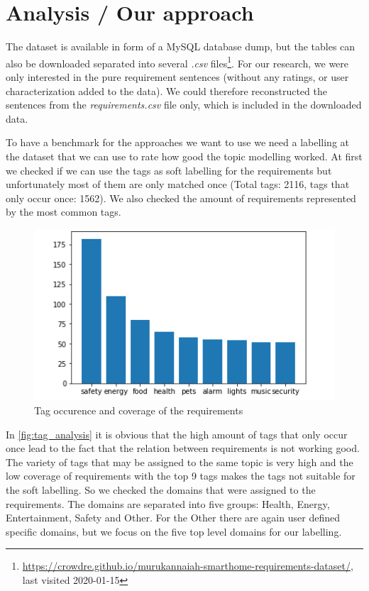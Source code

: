 \section{Analysis / Our approach} %
\label{sec:own_approach}

The \crowdre{} dataset is available in form of a MySQL database dump, but the tables can also be downloaded separated into several \textit{.csv} files\footnote{\url{https://crowdre.github.io/murukannaiah-smarthome-requirements-dataset/}, last visited 2020-01-15}. For our research, we were only interested in the pure requirement sentences (without any ratings, or user characterization added to the data). We could therefore reconstructed the sentences from the \textit{requirements.csv} file only, which is included in the downloaded data.

To have a benchmark for the approaches we want to use we need a labelling at the dataset that we can use to rate how good the topic modelling worked. At first we checked if we can use the tags as soft labelling for the requirements but unfortunately most of them are only matched once (Total tags: 2116, tags that only occur once: 1562). We also checked the amount of requirements represented by the most common tags. 

\begin{figure}[h]
  \centering
    \includegraphics[width=\textwidth]{screenshots/tag_analysis.png}
    \caption{Tag occurence and coverage of the requirements}
    \label{fig:tag_analysis}
\end{figure}

In \autoref{fig:tag_analysis} it is obvious that the high amount of tags that only occur once lead to the fact that the relation between requirements is not working good. The variety of tags that may be assigned to the same topic is very high and the low coverage of requirements with the top 9 tags makes the tags not suitable for the soft labelling. So we checked the domains that were assigned to the requirements. The domains are separated into five groups: Health, Energy, Entertainment, Safety and Other. For the \grqq{}Other\grqq{} there are again user defined specific domains, but we focus on the five top level domains for our labelling.

